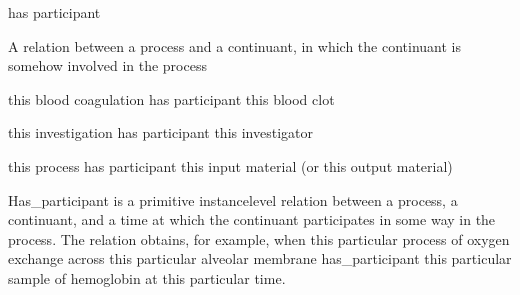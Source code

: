 \documentclass[letterpaper,10pt,english]{sphinxmanual}
\begin{document}
\begin{sphinxShadowBox}

\sphinxAtStartPar
has participant
\end{sphinxShadowBox}

\begin{sphinxShadowBox}

\sphinxAtStartPar
{}
\end{sphinxShadowBox}

\begin{sphinxShadowBox}

\sphinxAtStartPar
A relation between a process and a continuant, in which the continuant is somehow involved in the process
\end{sphinxShadowBox}

\begin{sphinxShadowBox}

\sphinxAtStartPar
this blood coagulation has participant this blood clot

\sphinxAtStartPar
this investigation has participant this investigator

\sphinxAtStartPar
this process has participant this input material (or this output material)
\end{sphinxShadowBox}

\begin{sphinxShadowBox}

\sphinxAtStartPar
Has\_participant is a primitive instance\sphinxhyphen{}level relation between a process, a continuant, and a time at which the continuant participates in some way in the process. The relation obtains, for example, when this particular process of oxygen exchange across this particular alveolar membrane has\_participant this particular sample of hemoglobin at this particular time.
\end{sphinxShadowBox}

\begin{sphinxShadowBox}

\sphinxAtStartPar
{}
\end{sphinxShadowBox}
\begin{quote}

\ignorespaces \end{quote}
\end{document}
